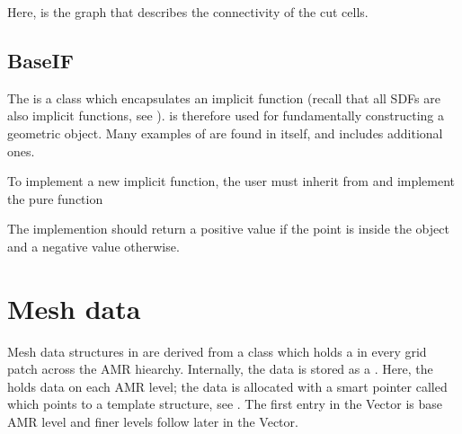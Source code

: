 \documentclass[letterpaper,10pt,english]{sphinxmanual}
\begin{document}
Here,  is the graph that describes the connectivity of the cut cells.


\subsection{BaseIF}
\label{\detokenize{Source/ChomboBasics:baseif}}\label{\detokenize{Source/ChomboBasics:chap-baseif}}
The  is a  class which encapsulates an implicit function (recall that all SDFs are also implicit functions, see {\hyperref[\detokenize{Source/SpatialDiscretization:chap-geometryrepresentation}]{}}).
 is therefore used for fundamentally constructing a geometric object.
Many examples of  are found in  itself, and  includes additional ones.

To implement a new implicit function, the user must inherit from  and implement the pure function

\begin{sphinxVerbatim}[commandchars=\\\{\},formatcom=\scriptsize]
       
\end{sphinxVerbatim}

The implemention should return a positive value if the point  is inside the object and a negative value otherwise.


\section{Mesh data}
\label{\detokenize{Source/MeshData:mesh-data}}\label{\detokenize{Source/MeshData:chap-meshdata}}\label{\detokenize{Source/MeshData::doc}}
Mesh data structures in  are derived from a class  which holds a  in every grid patch across the AMR hiearchy.
Internally, the data is stored as a .
Here, the  holds data on each AMR level; the data is allocated with a smart pointer called  which points to a  template structure, see {\hyperref[\detokenize{Source/ChomboBasics:chap-basics}]{}}.
The first entry in the Vector is base AMR level and finer levels follow later in the Vector.
\end{document}
